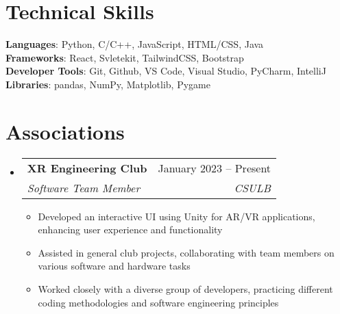 \documentclass[letterpaper,11pt]{article}
\makeatletter
\newcommand{\resumeItem}[1]{
  \item\small{
    {#1 \vspace{-2pt}}
  }
}
\newcommand{\resumeSubheading}[4]{
  \vspace{-2pt}\item
    \begin{tabular*}{0.97\textwidth}[t]{l@{\extracolsep{\fill}}r}
      \textbf{#1} & #2 \\
      \textit{\small#3} & \textit{\small #4} \\
    \end{tabular*}\vspace{-7pt}
}
\newcommand{\resumeSubHeadingListStart}{\begin{itemize}[leftmargin=0.15in, label={}]}
\newcommand{\resumeSubHeadingListEnd}{\end{itemize}}
\newcommand{\resumeItemListStart}{\begin{itemize}}
\newcommand{\resumeItemListEnd}{\end{itemize}\vspace{-5pt}}
\makeatother
\begin{document}
%
\section{Technical Skills}
 \begin{itemize}[leftmargin=0.15in, label={}]
    \small{\item{
     \textbf{Languages}{: Python, C/C++, JavaScript, HTML/CSS, Java} \\
     \textbf{Frameworks}{: React, Svletekit, TailwindCSS, Bootstrap} \\
     \textbf{Developer Tools}{: Git, Github, VS Code, Visual Studio, PyCharm, IntelliJ} \\
     \textbf{Libraries}{: pandas, NumPy, Matplotlib, Pygame}
    }}
 \end{itemize}



\section{Associations}
  \resumeSubHeadingListStart

    \resumeSubheading
      {XR Engineering Club}{January 2023 -- Present}
      {Software Team Member}{CSULB}
      \resumeItemListStart
        \resumeItem{Developed an interactive UI using Unity for AR/VR applications, enhancing user experience and functionality}
        \resumeItem{Assisted in general club projects, collaborating with team members on various software and hardware tasks}
        \resumeItem{Worked closely with a diverse group of developers, practicing different coding methodologies and software engineering principles}
      \resumeItemListEnd
    \resumeSubHeadingListEnd
\end{document}
